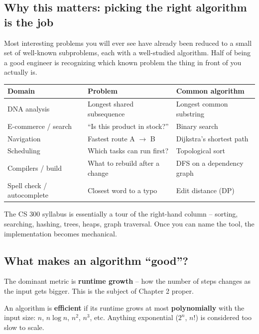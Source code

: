 \documentclass[11pt]{article}
\begin{document}
\subsection{Why this matters: picking the right algorithm is the job}

Most interesting problems you will ever see have already been reduced
to a small set of well-known subproblems, each with a well-studied
algorithm. Half of being a good engineer is recognizing which known
problem the thing in front of you actually is.

\begin{center}
\small
\begin{tabular}{lll}
\textbf{Domain} & \textbf{Problem} & \textbf{Common algorithm} \\
\hline
DNA analysis & Longest shared subsequence & Longest common substring \\
E-commerce / search & ``Is this product in stock?'' & Binary search \\
Navigation & Fastest route A $\to$ B & Dijkstra's shortest path \\
Scheduling & Which tasks can run first? & Topological sort \\
Compilers / build & What to rebuild after a change & DFS on a dependency graph \\
Spell check / autocomplete & Closest word to a typo & Edit distance (DP) \\
\end{tabular}
\normalsize
\end{center}

The CS 300 syllabus is essentially a tour of the right-hand column --
sorting, searching, hashing, trees, heaps, graph traversal. Once you
can name the tool, the implementation becomes mechanical.

\subsection{What makes an algorithm ``good''?}

The dominant metric is \textbf{runtime growth} -- how the number of
steps changes as the input gets bigger. This is the subject of Chapter
2 proper.

\begin{defnbox}
An algorithm is \textbf{efficient} if its runtime grows at most
\textbf{polynomially} with the input size: $n$, $n \log n$, $n^2$,
$n^3$, etc. Anything exponential ($2^n$, $n!$) is considered too slow
to scale.
\end{defnbox}
\end{document}
